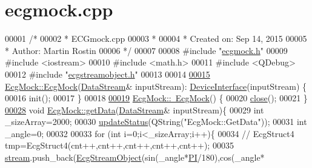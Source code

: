 \hypertarget{ecgmock_8cpp_source}{}\section{ecgmock.\+cpp}
\label{ecgmock_8cpp_source}

\begin{DoxyCode}
00001 \textcolor{comment}{/*}
00002 \textcolor{comment}{     * ECGmock.cpp}
00003 \textcolor{comment}{     *}
00004 \textcolor{comment}{     *  Created on: Sep 14, 2015}
00005 \textcolor{comment}{     *      Author: Martin Rostin}
00006 \textcolor{comment}{     */}
00007 
00008 \textcolor{preprocessor}{#include "\hyperlink{ecgmock_8h}{ecgmock.h}"}
00009 \textcolor{preprocessor}{#include <iostream>}
00010 \textcolor{preprocessor}{#include <math.h>}
00011 \textcolor{preprocessor}{#include <QDebug>}
00012 \textcolor{preprocessor}{#include "\hyperlink{ecgstreamobject_8h}{ecgstreamobject.h}"}
00013 
00014 
\hypertarget{ecgmock_8cpp_source.tex_l00015}{}\hyperlink{classEcgMock_a880936385845728f4d96a54848d8ab6e}{00015} \hyperlink{classEcgMock_a880936385845728f4d96a54848d8ab6e}{EcgMock::EcgMock}(\hyperlink{classDataStream}{DataStream}& inputStream): 
      \hyperlink{classDeviceInterface}{DeviceInterface}(inputStream) \{
00016     init();
00017 \}
00018 
\hypertarget{ecgmock_8cpp_source.tex_l00019}{}\hyperlink{classEcgMock_a977966ab6184171d95c9f9c01eca0c7a}{00019} \hyperlink{classEcgMock_a977966ab6184171d95c9f9c01eca0c7a}{EcgMock::~EcgMock}() \{
00020     \hyperlink{classEcgMock_a34af13005b5ea44386b7b875b72e9fc3}{close}();
00021 \}
\hypertarget{ecgmock_8cpp_source.tex_l00028}{}\hyperlink{classEcgMock_aaa2628c0e8364980e6f252dfc3b86d1a}{00028} \textcolor{keywordtype}{void} \hyperlink{classEcgMock_aaa2628c0e8364980e6f252dfc3b86d1a}{EcgMock::getData}(\hyperlink{classDataStream}{DataStream}& inputStream)\{
00029     \textcolor{keywordtype}{int} \_sizeArray=2000;
00030     \hyperlink{classDeviceInterface_ac64a65f54f41f0b7ff4c846ac7fdbef7}{updateStatus}(QString(\textcolor{stringliteral}{"EcgMock::GetData"}));
00031     \textcolor{keywordtype}{int} \_angle=0;
00032 
00033     \textcolor{keywordflow}{for} (\textcolor{keywordtype}{int} i=0;i<\_sizeArray;i++)\{
00034         \textcolor{comment}{//  EcgStruct4 tmp=EcgStruct4(cnt++,cnt++,cnt++,cnt++,cnt++);}
00035         \hyperlink{classDeviceInterface_ac98f5cd34bafb43265436b29b9f734fa}{stream}.push\_back(\hyperlink{structEcgStreamObject}{EcgStreamObject}(sin(\_angle*\hyperlink{ecgmock_8h_a598a3330b3c21701223ee0ca14316eca}{PI}/180),cos(\_angle*

\end{DoxyCode}
